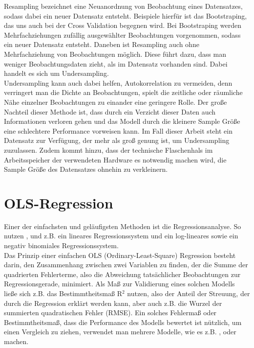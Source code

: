 \documentclass[a4paper,12pt]{thesis}
\begin{document}
Resampling bezeichnet eine Neuanordnung von Beobachtung eines Datensatzes, sodass dabei ein neuer Datensatz entsteht. Beispiele hierfür ist das Bootstraping, das uns auch bei der Cross Validation begegnen wird. Bei Bootstraping werden Mehrfachziehungen zufällig ausgewählter Beobachtungen vorgenommen, sodass ein neuer Datensatz entsteht. Daneben ist Resampling auch ohne Mehrfachziehung von Beobachtungen möglich. Diese führt dazu, dass man weniger Beobachtungsdaten zieht, als im Datensatz vorhanden sind. Dabei handelt es sich um Undersampling.\\
Undersampling kann auch dabei helfen, Autokorrelation zu vermeiden, denn verringert man die Dichte an Beobachtungen, spielt die zeitliche oder räumliche Nähe einzelner Beobachtungen zu einander eine geringere Rolle. Der große Nachteil dieser Methode ist, dass durch ein Verzicht dieser Daten auch Informationen verloren gehen und das Modell durch die kleinere Sample Größe eine schlechtere Performance vorweisen kann. Im Fall dieser Arbeit steht ein Datensatz zur Verfügung, der mehr als groß genung ist, um Undersampling zuzulassen. Zudem kommt hinzu, dass der technische Flaschenhals im Arbeitsspeicher der verwendeten Hardware es notwendig machen wird, die Sample Größe des Datensatzes ohnehin zu verkleinern.

\section{OLS-Regression}

Einer der einfachsten und geläufigsten Methoden ist die Regressionsanalyse. So nutzen \cite{Holmgren2017}, \cite{Alattar2021} und \cite{Gao2022} z.B. ein lineares Regressionssystem und \cite{Wessel2020} ein log-lineares sowie ein negativ binomiales Regressionssystem.\\
Das Prinzip einer einfachen OLS (Ordinary-Least-Square) Regression besteht darin, den Zusammenhang zwischen zwei Variablen zu finden, der die Summe der quadrierten Fehlerterme, also die Abweichung tatsächlicher Beobachtungen zur Regressionsgerade, minimiert. Als Maß zur Validierung eines solchen Modells ließe sich z.B. das Bestimmtheitsmaß R$^2$ nutzen, also der Anteil der Streuung, der durch die Regression erklärt werden kann, aber auch z.B. die Wurzel der summierten quadratischen Fehler (RMSE). Ein solches Fehlermaß oder Bestimmtheitsmaß, dass die Performance des Modells bewertet ist nützlich, um einen Vergleich zu ziehen, verwendet man mehrere Modelle, wie es z.B. \cite{Holmgren2017}, \cite{Broucke2019} oder \cite{Gao2022} machen.
\end{document}
